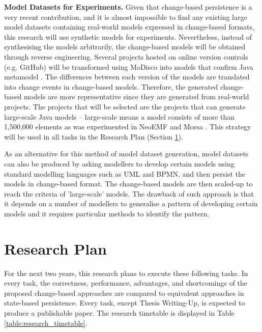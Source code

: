 \documentclass[12pt, a4paper]{report} \usepackage[titletoc]{appendix}
\begin{document}
\textbf{Model Datasets for Experiments.} Given that change-based persistence is a very recent contribution, and it is almost impossible to find any existing large model datasets containing real-world models expressed in change-based formats, this research will use synthetic models for experiments. Nevertheless, instead of synthesising the models arbitrarily, the change-based models will be obtained through reverse engineering. Several projects hosted on online version controls (e.g. GitHub) will be transformed using MoDisco \cite{DBLP:journals/infsof/BruneliereCDM14} into models that confirm Java metamodel \cite{eclipse2017modicso}. The differences between each version of the models are translated into change events in change-based models. Therefore, the generated change-based models are more representative since they are generated from real-world projects. The projects that will be selected are the projects that can generate large-scale Java models -- large-scale means a model consists of more than 1,500,000 elements as was experimented in NeoEMF \cite{daniel2016neoemf} and Morsa \cite{pagan2011morsa}. This strategy will be used in all tasks in the Research Plan (Section \ref{ch:research_plan}).

As an alternative for this method of model dataset generation, model datasets can also be produced by asking modellers to develop certain models using standard modelling languages such as UML and BPMN, and then persist the models in change-based format. The change-based models are then scaled-up to reach the criteria of 'large-scale' models. The drawback of such approach is that it depends on a number of modellers to generalise a pattern of developing certain models and it requires particular methods to identify the pattern.

\chapter{Research Plan}
\label{ch:research_plan}
For the next two years, this research plans to execute these following tasks. In every task, the correctness, performance, advantages, and shortcomings of the proposed change-based approaches are compared to equivalent approaches in state-based persistence. Every task, except Thesis Writing-Up, is expected to produce a publishable paper. The research timetable is displayed in Table \ref{table:research_timetable}.
\end{document}
